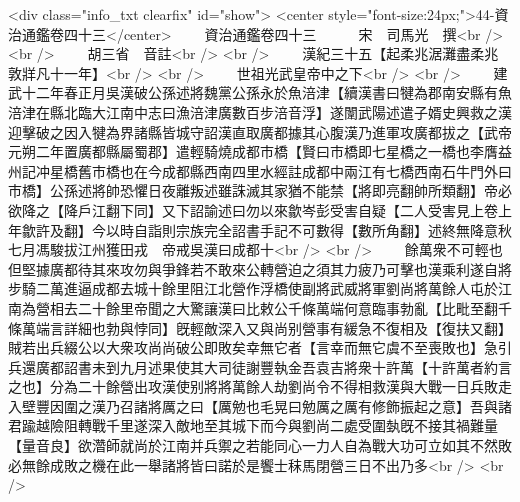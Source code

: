 <div class="info_txt clearfix" id="show">
<center style="font-size:24px;">44-資治通鑑卷四十三</center>
  　　資治通鑑卷四十三　　　宋　司馬光　撰<br />
<br />
　　胡三省　音註<br />
<br />
　　漢紀三十五【起柔兆涺灘盡柔兆敦牂凡十一年】<br />
<br />
　　世祖光武皇帝中之下<br />
<br />
　　建武十二年春正月吳漢破公孫述將魏黨公孫永於魚涪津【續漢書曰犍為郡南安縣有魚涪津在縣北臨大江南中志曰漁涪津廣數百步涪音浮】遂闈武陽述遣子婿史興救之漢迎擊破之因入犍為界諸縣皆城守詔漢直取廣都據其心腹漢乃進軍攻廣都拔之【武帝元朔二年置廣都縣屬蜀郡】遣輕騎燒成都市橋【賢曰市橋即七星橋之一橋也李膺益州記冲星橋舊市橋也在今成都縣西南四里水經註成都中兩江有七橋西南石牛門外曰市橋】公孫述將帥恐懼日夜離叛述雖誅滅其家猶不能禁【將即亮翻帥所類翻】帝必欲降之【降戶江翻下同】又下詔諭述曰勿以來歙岑彭受害自疑【二人受害見上卷上年歙許及翻】今以時自詣則宗族完全詔書手記不可數得【數所角翻】述終無降意秋七月馮駿拔江州獲田戎　帝戒吳漢曰成都十<br />
<br />
　　餘萬衆不可輕也但堅據廣都待其來攻勿與爭鋒若不敢來公轉營迫之須其力疲乃可擊也漢乘利遂自將步騎二萬進逼成都去城十餘里阻江北營作浮橋使副將武威將軍劉尚將萬餘人屯於江南為營相去二十餘里帝聞之大驚讓漢曰比敕公千條萬端何意臨事勃亂【比毗至翻千條萬端言詳細也勃與悖同】旣輕敵深入又與尚别營事有緩急不復相及【復扶又翻】賊若出兵綴公以大衆攻尚尚破公即敗矣幸無它者【言幸而無它虞不至喪敗也】急引兵還廣都詔書未到九月述果使其大司徒謝豐執金吾袁吉將衆十許萬【十許萬者約言之也】分為二十餘營出攻漢使别將將萬餘人劫劉尚令不得相救漢與大戰一日兵敗走入壁豐因圍之漢乃召諸將厲之曰【厲勉也毛晃曰勉厲之厲有修飾振起之意】吾與諸君踰越險阻轉戰千里遂深入敵地至其城下而今與劉尚二處受圍埶旣不接其禍難量【量音良】欲濳師就尚於江南并兵禦之若能同心一力人自為戰大功可立如其不然敗必無餘成敗之機在此一舉諸將皆曰諾於是饗士秣馬閉營三日不出乃多<br />
<br />
